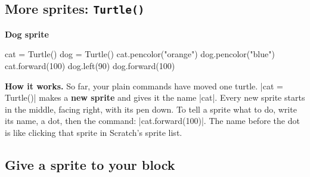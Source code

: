 \subsection*{More sprites: \texttt{Turtle()}}

\begin{tcbraster}[raster columns=2, raster equal height=rows, raster column skip=12pt, raster valign=center, raster force size=false, raster column 1/.style={add to width=-1.2cm}, raster column 2/.style={add to width=1.2cm}]
\begin{tcolorbox}[colback=white, colframe=white, boxrule=0pt, valign=center]
\par
\begin{scratch}
\end{scratch}
\par\smallskip
{\small\bfseries Dog sprite}\par
\begin{scratch}
\end{scratch}
\end{tcolorbox}
\begin{code}
cat = Turtle()
dog = Turtle()
cat.pencolor("orange")
dog.pencolor("blue")
cat.forward(100)
dog.left(90)
dog.forward(100)
\end{code}
\end{tcbraster}

\textbf{How it works.} So far, your plain commands have moved one turtle. \py|cat = Turtle()| makes a \textbf{new sprite} and gives it the name \py|cat|. Every new sprite starts in the middle, facing right, with its pen down. To tell a sprite what to do, write its name, a dot, then the command: \py|cat.forward(100)|. The name before the dot is like clicking that sprite in Scratch's sprite list.


\subsection*{Give a sprite to your block}

